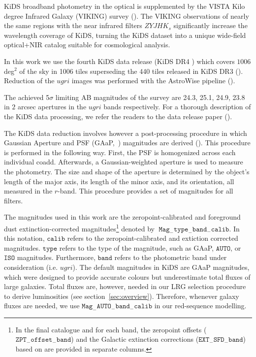 \documentclass[fleqn,usenatbib,useAMS]{mnras}
\begin{document}
KiDS broadband photometry in the optical is supplemented by the VISTA Kilo degree Infrared Galaxy (VIKING) survey (\citealt{irwin2004,lewis2010,Edge2013,Gonz2018}). The VIKING observations of nearly the same regions with the near infrared filters $ZYJHK_{s}$ significantly increase the wavelength coverage of KiDS, turning the KiDS dataset into a unique wide-field optical+NIR catalog suitable for cosmological analysis.

In this work we use the fourth KiDS data release (KiDS DR4 \citealt{kuijken2019}) which covers $1006$ deg$^{2}$ of the sky in 1006 tiles superseding the 440 tiles released in KiDS DR3 (\citealt{kids_dr3}). Reduction of the $ugri$ images was performed with the AstroWise pipeline (\citealt{omegacam}).  


The achieved 5$\sigma$ limiting AB magnitudes of the survey are 24.3, 25.1, 24.9, 23.8 in $2$ arcsec apertures in the $ugri$ bands respectively. For a thorough description of the KiDS data processing, we refer the readers to the data release paper (\citealt{kuijken2019}). 


The KiDS data reduction involves however a post-processing procedure in which Gaussian Aperture and PSF (GAaP,~\citealt{gaap}) magnitudes are derived (\citealt{kuijken2015}). This procedure is performed in the following way. First, the PSF is homogenized across each individual coadd. Afterwards, a Gaussian-weighted aperture is used to measure the photometry. The size and shape of the aperture is determined by the object's length of the major axis, its length of the minor axis, and its orientation, all measured in the $r$-band. This procedure provides a set of magnitudes for all filters. 

The magnitudes used in this work are the zeropoint-calibrated and foreground dust extinction-corrected magnitudes\footnote{In the final catalogue and for each band, the zeropoint offsets ($\mathtt{ZPT}_{-}\mathtt{offset}_{-}\mathtt{band}$) and the Galactic extinction corrections ($\mathtt{EXT}_{-}\mathtt{SFD}_{-}\mathtt{band}$) based on \citet{schlegel98} are provided in separate columns.} 
denoted by $\; \mathtt{Mag}_{-}\mathtt{type}_{-}\mathtt{band}_{-}\mathtt{calib}$. 
In this notation, $\mathtt{calib}$ refers to the zeropoint-calibrated and extiction corrected magnitudes. $\mathtt{type}$ refers to the type of the magnitude, such as GAaP, $\mathtt{AUTO}$, or $\mathtt{ISO}$ magnitudes. Furthermore, $\mathtt{band}$ refers to the photometric band under consideration (i.e. $ugri$). The default magnitudes in KiDS are GAaP magnitudes, which were designed to provide accurate colours but underestimate total fluxes of large galaxies. Total fluxes are, however, needed in our LRG selection procedure to derive luminosities (see section~\ref{sec:overview}). Therefore, whenever galaxy fluxes are needed, we use $\mathtt{Mag}_{-}\mathtt{AUTO}_{-}\mathtt{band}_{-}\mathtt{calib}$ in our red-sequence modelling. 
\end{document}
